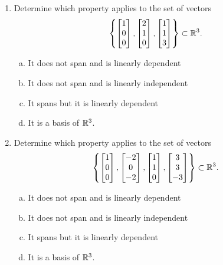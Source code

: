\documentclass{article}
\begin{document}
\begin{enumerate}[1)]
\item Determine which property applies to the set of vectors $$\left\{ \begin{bmatrix}  1 \\ 0 \\ 0 \end{bmatrix}, \begin{bmatrix} 2 \\ 1 \\ 0 \end{bmatrix} , \begin{bmatrix} 1 \\ 1 \\ 3 \end{bmatrix} \right\}\subset \mathbb{R}^3.$$
\begin{enumerate}[(a)]
\item It does not span and is linearly dependent
\item It does not span and is linearly independent
\item It spans but it is linearly dependent
\item It is a basis of $\mathbb{R}^3$.
\end{enumerate}

\item Determine which property applies to the set of vectors $$\left\{ \begin{bmatrix}  1 \\ 0 \\ 0 \end{bmatrix}, \begin{bmatrix} -2 \\ 0 \\ -2 \end{bmatrix} , \begin{bmatrix} 1 \\ 1 \\ 0 \end{bmatrix} , \begin{bmatrix} 3 \\ 3 \\ -3 \end{bmatrix}\right\}\subset \mathbb{R}^3.$$
\begin{enumerate}[(a)]
\item It does not span and is linearly dependent
\item It does not span and is linearly independent
\item It spans but it is linearly dependent
\item It is a basis of $\mathbb{R}^3$.
\end{enumerate}


\end{enumerate}
\end{document}
